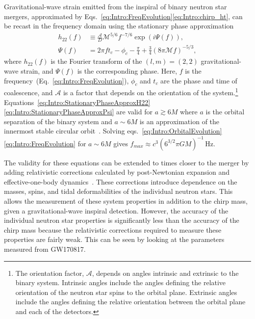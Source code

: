 \documentclass[../Thesis.tex]{subfiles}
\begin{document}
    Gravitational-wave strain emitted from the inspiral of binary neutron star mergers, approximated by Eqs.~\ref{eq:Intro:FreqEvolution}\Hyphdash*\ref{eq:Intro:chirp_ht}, can be recast in the frequency domain using the stationary phase approximation~\cite{Cutler1994}
    \begin{align}
        h_{22}(f) & \equiv \frac{\mathcal{A}}{D}\mathcal{M}^{5/6}f^{-7/6} \exp(i\Psi(f)), \label{eq:Intro:StationaryPhaseApproxH22} \\
        \Psi(f) & = 2\pi f t_c - \phi_c - \frac{\pi}{4} +\frac{3}{4}\left(8\pi\mathcal{M}f\right)^{-5/3}, \label{eq:Intro:StationaryPhaseApproxPsi} 
    \end{align}
    where $h_{22}(f)$ is the Fourier transform of the $(l,m)=(2,2)$ gravitational-wave strain, and $\Psi(f)$ is the corresponding phase.
    Here, $f$ is the frequency~(Eq.~\ref{eq:Intro:FreqEvolution}), $\phi_c$ and $t_c$ are the phase and time of coalescence, and $\mathcal{A}$ is a factor that depends on the orientation of the system.\footnote{The orientation factor, $\mathcal{A}$, depends on angles intrinsic and extrinsic to the binary system. Intrinsic angles include the angles defining the relative orientation of the neutron star spins to the orbital plane. Extrinsic angles include the angles defining the relative orientation between the orbital plane and each of the detectors.}
    Equations~\ref{eq:Intro:StationaryPhaseApproxH22}\Hyphdash*\ref{eq:Intro:StationaryPhaseApproxPsi} are valid for $a \gtrsim 6M$ where $a$ is the orbital separation of the binary system and $a\sim 6M$ is an approximation of the innermost stable circular orbit~\cite{Cutler1994}.
    Solving eqs.~\ref{eq:Intro:OrbitalEvolution}\Hyphdash*\ref{eq:Intro:FreqEvolution} for $a \sim 6M$ gives $f_{max}\approx c^3 ( 6^{3/2}\pi G M )^{-1}\,\mathrm{Hz}$.
    \par
    The validity for these equations can be extended to times closer to the merger by adding relativistic corrections calculated by post-Newtonian expansion and effective-one-body dynamics~\cite{Cutler1994,Blanchet1995, Buonanno1999,Droz1999,Damour2012,Yagi2013,Blanchet2014}. %
    These corrections introduce dependence on the masses, spins, and tidal deformabilities of the individual neutron stars.
    This allows the measurement of these system properties in addition to the chirp mass, given a gravitational-wave inspiral detection.
    However, the accuracy of the individual neutron star properties is significantly less than the accuracy of the chirp mass because the relativistic corrections required to measure these properties are fairly weak. 
    This can be seen by looking at the parameters measured from GW170817.
\end{document}
